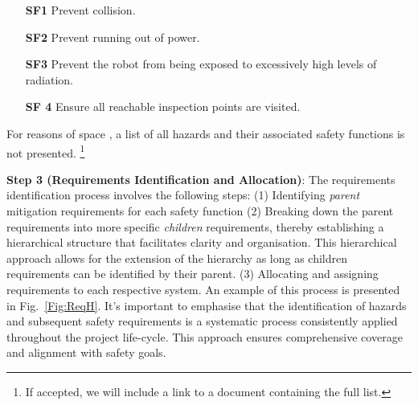 \documentclass[conference]{IEEEtran}
\newcommand{\louisenote}[1]{\todo[color=green!65]{Louise: #1}}
\begin{document}
\begin{itemize}
    \item [\textbf{SF1}] Prevent collision.
    \item [\textbf{SF2}] Prevent running out of power.
    \item [\textbf{SF3}] Prevent the robot from being exposed to excessively high levels of radiation.
    \item [\textbf{SF 4}] Ensure all reachable inspection points are visited.
\end{itemize}

For reasons of space%
, a list of all hazards and their associated safety functions is not presented. \footnote{If accepted, we will include a link to a document containing the full list.}



\medskip
\noindent\textbf{Step 3 (Requirements Identification and Allocation)}: 
The requirements identification process involves the following steps: (1) Identifying \textit{parent} mitigation requirements for each safety function 
(2) Breaking down the parent requirements into more specific \textit{children} requirements, thereby establishing a hierarchical structure that facilitates clarity and organisation. This hierarchical approach allows for the extension of the hierarchy as long as children requirements can be identified by their parent. (3) Allocating and assigning requirements to each respective system. An example of this process is presented in  Fig.~\ref{Fig:ReqH}. It's important to emphasise that the identification of hazards and subsequent safety requirements is a systematic process consistently applied throughout the project life-cycle. This approach ensures comprehensive coverage and alignment with safety goals.
\end{document}
